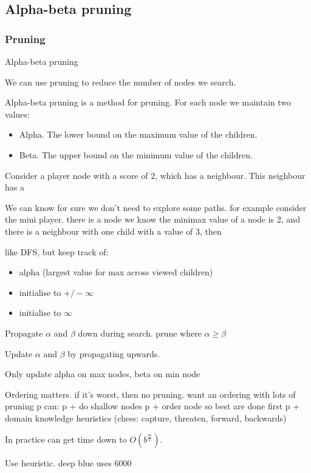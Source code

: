
\subsection{Alpha-beta pruning}

\subsubsection{Pruning}

Alpha-beta pruning

We can use pruning to reduce the number of nodes we search.

Alpha-beta pruning is a method for pruning. For each node we maintain two values:

\begin{itemize}
\item Alpha. The lower bound on the maximum value of the children.
\item Beta. The upper bound on the minimum value of the children.
\end{itemize}

Consider a player node with a score of \(2\), which has a neighbour. This neighbour has a 

We can know for sure we don't need to explore some paths. for example consider the mini player. there is a node we know the minimax value of a node is 2, and there is a neighbour with one child with a value of 3, then 
	

like DFS, but keep track of:

\begin{itemize}
\item alpha (largest value for max across viewed children)
\item initialise to  \(+/-\infty \)
\item initialise to \(\infty \)
\end{itemize}

Propagate \(\alpha \) and \(\beta \) down during search. prune where \(\alpha \ge \beta \)

Update \(\alpha \) and \(\beta \) by propagating upwards.

Only update alpha on max nodes, beta on min node


Ordering matters. if it's worst, then no pruning. want an ordering with lots of pruning
	p can:
	p + do shallow nodes
	p + order node so best are done first
	p + domain knowledge heuristics (chess: capture, threaten, forward, backwards)

In practice can get time down to \(O(b^\frac{m}{2})\).

Use heuristic. deep blue uses \(6000\)

